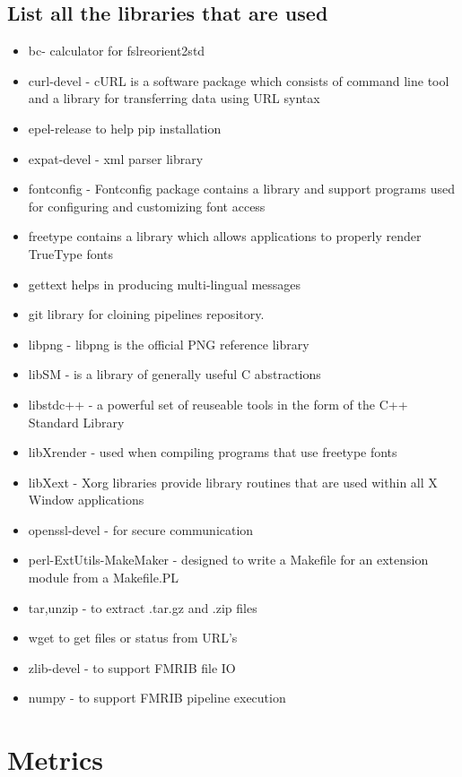 \subsection{List all the libraries that are used}
\begin{itemize}
 \item bc- calculator for fslreorient2std
 \item curl-devel - cURL is a software package which consists of command line tool and a library for transferring data using URL syntax
 \item epel-release to help pip installation
 \item expat-devel - xml parser library
 \item fontconfig - Fontconfig package contains a library and support programs used for configuring and customizing font access
 \item freetype contains a library which allows applications to properly render TrueType fonts
 \item gettext helps in producing multi-lingual messages
 \item git library for cloining pipelines repository.
 \item libpng - libpng is the official PNG reference library
 \item libSM - is a library of generally useful C abstractions
 \item libstdc++ - a powerful set of reuseable tools in the form of the C++ Standard Library
 \item libXrender - used when compiling programs that use freetype fonts
 \item libXext - Xorg libraries provide library routines that are used within all X Window applications
 \item openssl-devel - for secure communication
 \item perl-ExtUtils-MakeMaker - designed to write a Makefile for an extension module from a Makefile.PL
 \item tar,unzip - to extract .tar.gz and .zip files
 \item wget to get files or status from URL's
 \item zlib-devel - to support FMRIB file IO
 \item numpy - to support FMRIB pipeline execution
\end{itemize}

\section{Metrics}
